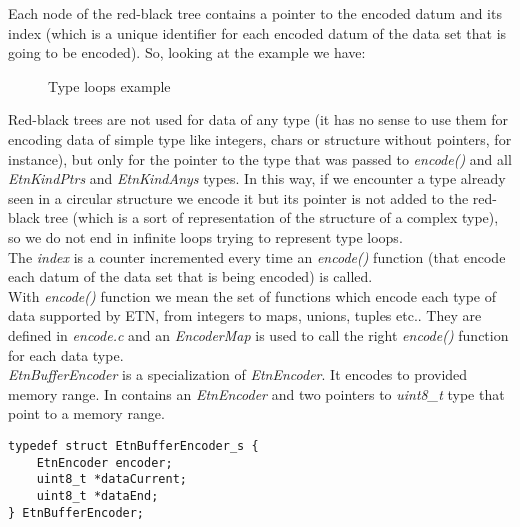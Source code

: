 Each node of the red-black tree contains a pointer to the encoded datum and its index (which is a unique identifier for each encoded datum of the data set that is going to be encoded). So, looking at the example we have:
\begin{figure}[H]
\centering
{}

\caption{Type loops example}
\end{figure}
Red-black trees are not used for data of any type (it has no sense to use them for encoding data of simple type like integers, chars or structure without pointers, for instance), but only for the pointer to the type that was passed to \emph{encode()} and all \emph{EtnKindPtrs} and \emph{EtnKindAnys} types. In this way, if we encounter a type already seen in a circular structure we encode it but its pointer is not added to the red-black tree (which is a sort of representation of the structure of a complex type), so we do not end in infinite loops trying to represent type loops. \\
The \emph{index} is a counter incremented every time an \emph{encode()} function (that encode each datum of the data set that is being encoded) is called. \\
With \emph{encode()} function we mean the set of functions which encode each type of data supported by ETN, from integers to maps, unions, tuples etc.. They are defined in \emph{encode.c} and an \emph{EncoderMap} is used to call the right \emph{encode()} function for each data type.\\
\emph{EtnBufferEncoder} is a specialization of \emph{EtnEncoder}. It encodes to provided memory range. In contains an \emph{EtnEncoder} and two pointers to \emph{uint8\_t} type that point to a memory range.
\begin{lstlisting}
typedef struct EtnBufferEncoder_s {
	EtnEncoder encoder;
	uint8_t *dataCurrent;
	uint8_t *dataEnd;
} EtnBufferEncoder;
\end{lstlisting}
